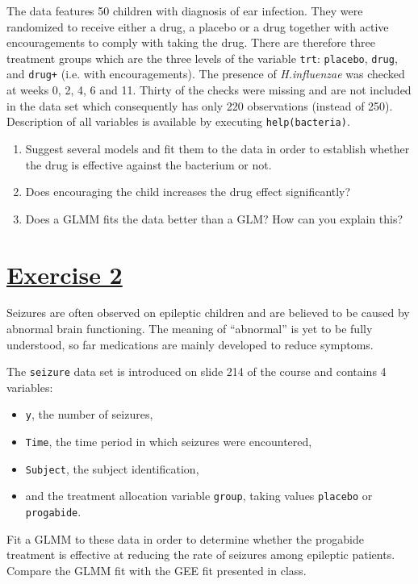 \documentclass[a4paper,12pt]{article}\usepackage[]{graphicx}\usepackage[]{color}
\begin{document}
The data features 50 children with diagnosis of ear infection. They were randomized to receive either a drug, a placebo or a drug together with active encouragements to comply with taking the drug. There are therefore three treatment groups which are the three levels of the variable \verb"trt": \verb"placebo", \verb"drug", and \verb"drug+" (i.e. with encouragements).
The presence of \emph{H.influenzae} was checked at weeks 0, 2, 4, 6 and 11. Thirty of the checks were missing and are not included in the data set which consequently has only 220 observations (instead of 250). Description of all variables is available by executing \verb"help(bacteria)".
\begin{enumerate}
\item{Suggest several models and fit them to the data in order to establish whether the drug is effective against the bacterium or not.} %
\item{Does encouraging the child increases the drug effect significantly?}
\item{Does a GLMM fits the data better than a GLM? How can you explain this?}
\end{enumerate}

\section{\underline{Exercise 2}}

Seizures are often observed on epileptic children and are believed to be caused by abnormal brain functioning. The meaning of ``abnormal'' is yet to be fully understood, so far medications are mainly developed to reduce symptoms.

The \verb"seizure" data set is introduced on slide 214 of the course and contains 4 variables:
\begin{itemize}
\item{\verb"y", the number of seizures,}
\item{\verb"Time", the time period in which seizures were encountered,}
\item{\verb"Subject", the subject identification,}
\item{and the treatment allocation variable \verb"group", taking values \verb"placebo" or \verb"progabide".}
\end{itemize}
Fit a GLMM to these data in order to determine whether the progabide treatment is effective at reducing the rate of seizures among epileptic patients. Compare the GLMM fit with the GEE fit presented in class.
\end{document}
